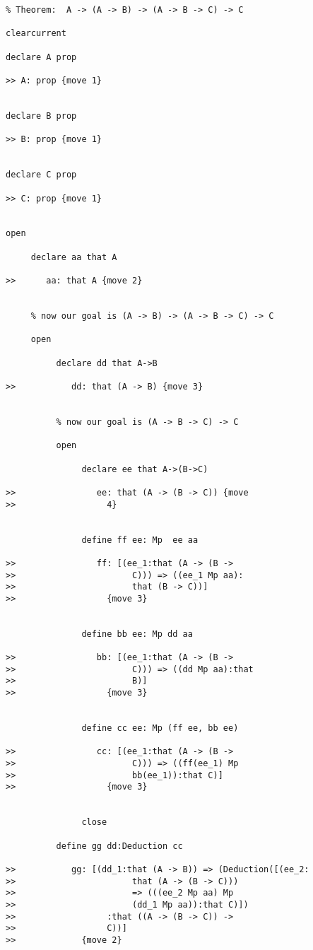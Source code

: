 \documentclass[12pt]{article}
\begin{document}
\begin{verbatim}
% Theorem:  A -> (A -> B) -> (A -> B -> C) -> C

clearcurrent

declare A prop

>> A: prop {move 1}


declare B prop

>> B: prop {move 1}


declare C prop

>> C: prop {move 1}


open

     declare aa that A

>>      aa: that A {move 2}


     % now our goal is (A -> B) -> (A -> B -> C) -> C

     open

          declare dd that A->B

>>           dd: that (A -> B) {move 3}


          % now our goal is (A -> B -> C) -> C

          open

               declare ee that A->(B->C)

>>                ee: that (A -> (B -> C)) {move 
>>                  4}


               define ff ee: Mp  ee aa

>>                ff: [(ee_1:that (A -> (B -> 
>>                       C))) => ((ee_1 Mp aa):
>>                       that (B -> C))]
>>                  {move 3}


               define bb ee: Mp dd aa

>>                bb: [(ee_1:that (A -> (B -> 
>>                       C))) => ((dd Mp aa):that 
>>                       B)]
>>                  {move 3}


               define cc ee: Mp (ff ee, bb ee)

>>                cc: [(ee_1:that (A -> (B -> 
>>                       C))) => ((ff(ee_1) Mp 
>>                       bb(ee_1)):that C)]
>>                  {move 3}


               close

          define gg dd:Deduction cc

>>           gg: [(dd_1:that (A -> B)) => (Deduction([(ee_2:
>>                       that (A -> (B -> C))) 
>>                       => (((ee_2 Mp aa) Mp 
>>                       (dd_1 Mp aa)):that C)])
>>                  :that ((A -> (B -> C)) -> 
>>                  C))]
>>             {move 2}



\end{verbatim}
\end{document}
